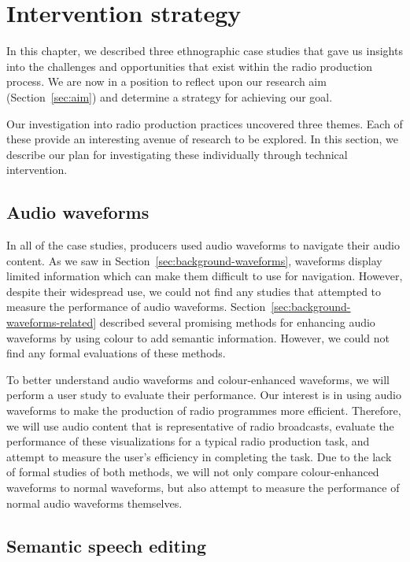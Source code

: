 \section{Intervention strategy}

In this chapter, we described three ethnographic case studies that gave us insights into the challenges and
opportunities that exist within the radio production process.  We are now in a position to reflect upon our research
aim (Section~\ref{sec:aim}) and determine a strategy for achieving our goal.

Our investigation into radio production practices uncovered three themes. Each of these provide an interesting avenue
of research to be explored. In this section, we describe our plan for investigating these individually through
technical intervention.

\subsection{Audio waveforms}

In all of the case studies, producers used audio waveforms to navigate their audio content.  As we saw in
Section~\ref{sec:background-waveforms}, waveforms display limited information which can make them difficult to use for
navigation.  However, despite their widespread use, we could not find any studies that attempted to measure the
performance of audio waveforms.  Section~\ref{sec:background-waveforms-related} described several promising methods for
enhancing audio waveforms by using colour to add semantic information. However, we could not find any formal
evaluations of these methods.

To better understand audio waveforms and colour-enhanced waveforms, we will perform a user study to evaluate their
performance. Our interest is in using audio waveforms to make the production of radio programmes more efficient.
Therefore, we will use audio content that is representative of radio broadcasts, evaluate the performance of these
visualizations for a typical radio production task, and attempt to measure the user's efficiency in completing the
task. Due to the lack of formal studies of both methods, we will not only compare colour-enhanced waveforms to normal
waveforms, but also attempt to measure the performance of normal audio waveforms themselves.

\subsection{Semantic speech editing}

